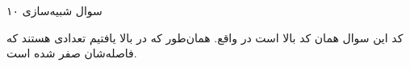 سوال شبیه‌سازی ۱۰


کد این سوال همان کد بالا است در واقع.
همان‌طور که در بالا یافتیم تعدادی هستند که فاصله‌شان صفر شده است.